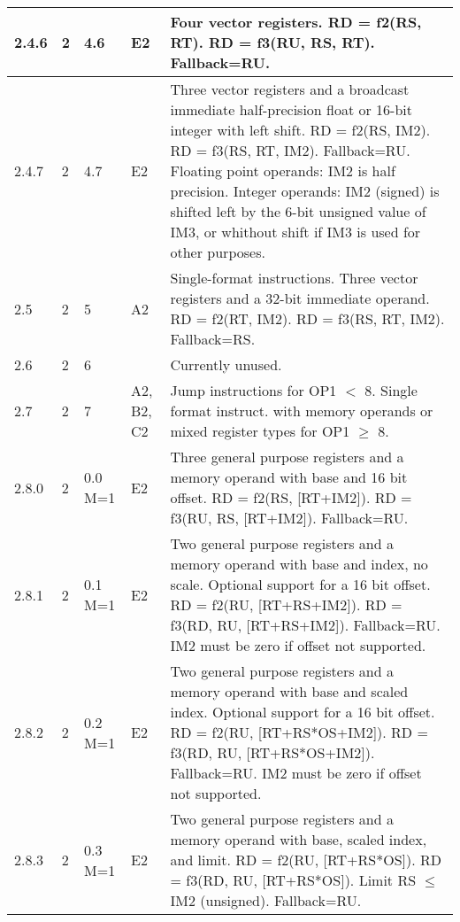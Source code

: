 \documentclass[forwardcom.tex]{subfiles}
\begin{document}
\begin{longtable} {|p{10mm}|p{6mm}|p{9mm}|p{7mm}|p{80mm}|}
\hline
2.4.6 & 2 & 4.6 & E2 & Four vector registers.\newline 
RD = f2(RS, RT). RD = f3(RU, RS, RT). Fallback=RU.\\

\hline
2.4.7 & 2 & 4.7 & E2 & Three vector registers and a broadcast immediate half-precision float or 16-bit integer with left shift.\newline 
RD = f2(RS, IM2). RD = f3(RS, RT, IM2). Fallback=RU.\newline
Floating point operands: IM2 is half precision.
Integer operands: IM2 (signed) is shifted left by the 6-bit unsigned value of IM3, or whithout shift if IM3 is used for other purposes. \\

\hline
2.5 & 2 & 5 & A2 & Single-format instructions. Three vector registers and a 32-bit immediate operand.\newline 
RD = f2(RT, IM2). RD = f3(RS, RT, IM2). Fallback=RS.\\

\hline
2.6 & 2 & 6 &  & Currently unused.\\

\hline
2.7 & 2 & 7 & A2, B2, C2 & Jump instructions for OP1 $<$ 8. Single format instruct. with memory operands or mixed register types for OP1 $\geq$ 8.\\

\hline
2.8.0 & 2 & 0.0 M=1 & E2 & Three general purpose registers and a memory operand with base  and 16 bit offset.\newline 
RD = f2(RS, [RT+IM2]). RD = f3(RU, RS, [RT+IM2]). Fallback=RU.\\

\hline
2.8.1 & 2 & 0.1 M=1 & E2 & Two general purpose registers and a memory operand with base and index, no scale. Optional support for a 16 bit offset.\newline 
RD = f2(RU, [RT+RS+IM2]). RD = f3(RD, RU, [RT+RS+IM2]). Fallback=RU. IM2 must be zero if offset not supported.\\

\hline
2.8.2 & 2 & 0.2 M=1 & E2 & Two general purpose registers and a memory operand with base and scaled index. Optional support for a 16 bit offset.\newline 
RD = f2(RU, [RT+RS*OS+IM2]). RD = f3(RD, RU, [RT+RS*OS+IM2]). Fallback=RU. IM2 must be zero if offset not supported.\\

\hline
2.8.3 & 2 & 0.3 M=1 & E2 & Two general purpose registers and a memory operand with base, scaled index, and limit.\newline 
RD = f2(RU, [RT+RS*OS]). RD = f3(RD, RU, [RT+RS*OS]). Limit RS $\leq$ IM2 (unsigned). Fallback=RU.\\


\end{longtable}
\end{document}
